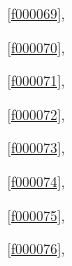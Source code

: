 \noindent\filesourcenumbernameone\ \ref{f000069},\ \pageref{f000069}%

\noindent\filesourcenumbernameone\ \ref{f000070},\ \pageref{f000070}%

\noindent\filesourcenumbernameone\ \ref{f000071},\ \pageref{f000071}%

\noindent\filesourcenumbernameone\ \ref{f000072},\ \pageref{f000072}%

\noindent\filesourcenumbernameone\ \ref{f000073},\ \pageref{f000073}%

\noindent\filesourcenumbernameone\ \ref{f000074},\ \pageref{f000074}%

\noindent\filesourcenumbernameone\ \ref{f000075},\ \pageref{f000075}%

\noindent\filesourcenumbernameone\ \ref{f000076},\ \pageref{f000076}%









